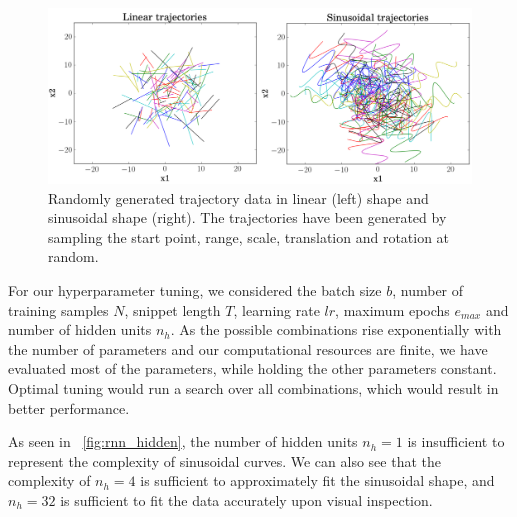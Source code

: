 \begin{figure}
	\centering
	\includegraphics [trim=0 0 0 0, clip, angle=0, width=1.0\columnwidth,
	keepaspectratio]{figures/lin_sin_traj}
	\caption{Randomly generated trajectory data in linear (left) shape and sinusoidal shape (right). The trajectories have been generated by sampling the start point, range, scale, translation and rotation at random.} 
	\label{fig:lin_sin_traj} 
\end{figure}
For our hyperparameter tuning, we considered the batch size $b$, number of training samples $N$, snippet length $T$, learning rate $lr$, maximum epochs $e_{max}$ and number of hidden units $n_h$. 
As the possible combinations rise exponentially with the number of parameters and our computational resources are finite, we have evaluated most of the parameters, while holding the other parameters constant.
Optimal tuning would run a search over all combinations, which would result in better performance.

As seen in ~\cref{fig:rnn_hidden}, the number of hidden units $n_h = 1$ is insufficient to represent the complexity of sinusoidal curves.
We can also see that the complexity of $n_h=4$ is sufficient to approximately fit the sinusoidal shape, and $n_h=32$ is sufficient to fit the data accurately upon visual inspection.


